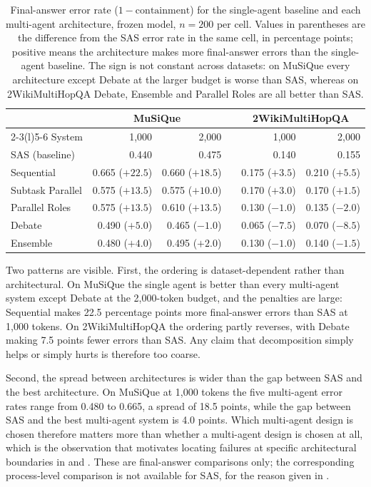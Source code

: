 \begin{table}[htbp]
  \centering
  \small
  \caption[Final-answer error rates, SAS versus each MAS]{Final-answer error rate
  ($1-\mathrm{containment}$) for the single-agent baseline and each multi-agent architecture,
  frozen model, $n=200$ per cell. Values in parentheses are the difference from the SAS error rate
  in the same cell, in percentage points; positive means the architecture makes more final-answer
  errors than the single-agent baseline. The sign is not constant across datasets: on MuSiQue every
  architecture except Debate at the larger budget is worse than SAS, whereas on 2WikiMultiHopQA
  Debate, Ensemble and Parallel Roles are all better than SAS.}
  \label{tab:sas-gap}
  \begin{tabular}{@{}lrrcrr@{}}
    \toprule
    & \multicolumn{2}{c}{MuSiQue} & & \multicolumn{2}{c}{2WikiMultiHopQA} \\
    \cmidrule(r){2-3}\cmidrule(l){5-6}
    System & 1,000 & 2,000 & & 1,000 & 2,000 \\
    \midrule
    SAS (baseline) & 0.440 & 0.475 & & 0.140 & 0.155 \\
    \addlinespace
    Sequential & 0.665 ($+22.5$) & 0.660 ($+18.5$) & & 0.175 ($+3.5$) & 0.210 ($+5.5$) \\
    Subtask Parallel & 0.575 ($+13.5$) & 0.575 ($+10.0$) & & 0.170 ($+3.0$) & 0.170 ($+1.5$) \\
    Parallel Roles & 0.575 ($+13.5$) & 0.610 ($+13.5$) & & 0.130 ($-1.0$) & 0.135 ($-2.0$) \\
    Debate & 0.490 ($+5.0$) & 0.465 ($-1.0$) & & 0.065 ($-7.5$) & 0.070 ($-8.5$) \\
    Ensemble & 0.480 ($+4.0$) & 0.495 ($+2.0$) & & 0.130 ($-1.0$) & 0.140 ($-1.5$) \\
    \bottomrule
  \end{tabular}
\end{table}

Two patterns are visible. First, the ordering is dataset-dependent rather than architectural. On MuSiQue the single agent is better than every multi-agent system except Debate at the 2,000-token budget, and the penalties are large: Sequential makes 22.5 percentage points more final-answer errors than SAS at 1,000 tokens. On 2WikiMultiHopQA the ordering partly reverses, with Debate making 7.5 points fewer errors than SAS. Any claim that decomposition simply helps or simply hurts is therefore too coarse.

Second, the spread between architectures is wider than the gap between SAS and the best architecture. On MuSiQue at 1,000 tokens the five multi-agent error rates range from 0.480 to 0.665, a spread of 18.5 points, while the gap between SAS and the best multi-agent system is 4.0 points. Which multi-agent design is chosen therefore matters more than whether a multi-agent design is chosen at all, which is the observation that motivates locating failures at specific architectural boundaries in  and . These are final-answer comparisons only; the corresponding process-level comparison is not available for SAS, for the reason given in .

